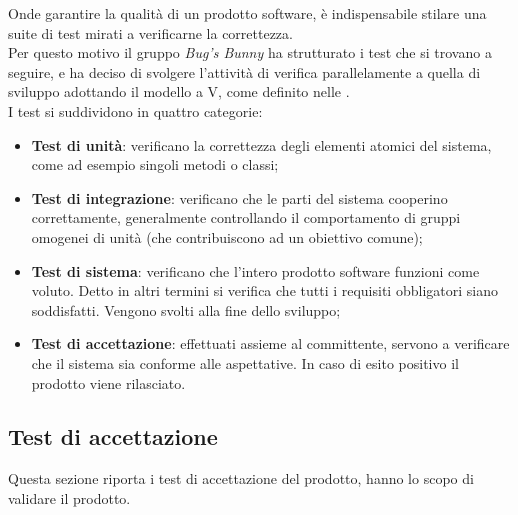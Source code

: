 
Onde garantire la qualità di un prodotto software, è indispensabile stilare una suite di test
mirati a verificarne la correttezza. \\
Per questo motivo il gruppo \textit{Bug's Bunny} ha strutturato i test che si trovano a seguire, e ha deciso 
di svolgere l'attività di verifica parallelamente a quella di sviluppo adottando il modello a V, 
come definito nelle \NdP. \\
I test si suddividono in quattro categorie:

\begin{itemize}
	\item \textbf{Test di unità}:  verificano la correttezza degli elementi atomici del sistema, come ad esempio singoli metodi o classi;
	\item \textbf{Test di integrazione}: verificano che le parti del sistema cooperino correttamente, generalmente controllando il comportamento di gruppi omogenei di unità (che contribuiscono ad un obiettivo comune);
	\item \textbf{Test di sistema}: verificano che l'intero prodotto software funzioni come voluto. Detto in altri termini si verifica che tutti i requisiti obbligatori siano soddisfatti. Vengono svolti alla fine dello sviluppo;
	\item \textbf{Test di accettazione}: effettuati assieme al committente, servono a verificare che il sistema sia conforme alle aspettative. In caso di esito positivo il prodotto viene rilasciato.
\end{itemize}

\subsection{Test di accettazione}
Questa sezione  riporta i test di accettazione del prodotto, hanno lo scopo di validare il prodotto.


